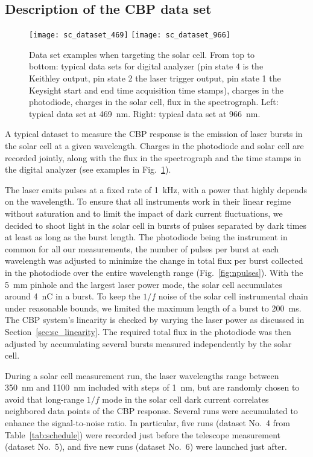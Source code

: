 \subsection{Description of the CBP data set}
\label{sec:cbp_datadesc}

\begin{figure}%
\centering
\texttt{[image: sc\_dataset\_469]}
\texttt{[image: sc\_dataset\_966]}
\caption{Data set examples when targeting the solar cell. From top to bottom: typical data sets for digital analyzer (pin state 4 is the Keithley output, pin state 2 the laser trigger output, pin state 1 the Keysight start and end time acquisition time stamps), charges in the photodiode, charges in the solar cell, flux in the spectrograph. Left: typical data set at \SI{469}{\nm}. Right: typical data set at \SI{966}{\nm}.}\label{fig:sc_dataset_examples}
\end{figure}

A typical dataset to measure the CBP response is the emission of laser bursts in the solar cell at a given wavelength. Charges in the photodiode and solar cell are recorded jointly, along with the flux in the spectrograph and the time stamps in the digital analyzer (see examples in Fig.~\ref{fig:sc_dataset_examples}).

The laser emits pulses at a fixed rate of \SI{1}{\kilo\hertz}, with a power that highly depends on the wavelength. To ensure that all instruments work in their linear regime without saturation and to limit the impact of dark current fluctuations, we decided to shoot light in the solar cell in bursts of pulses separated by dark times at least as long as the burst length. The photodiode being the instrument in common for all our measurements, the number of pulses per burst at each wavelength was adjusted to minimize the change in total flux per burst collected in the photodiode over the entire wavelength range (Fig.~\ref{fig:npulses}). With the \SI{5}{\mm} pinhole and the largest laser power mode, the solar cell accumulates around \SI{4}{\nano\coulomb} in a burst. To keep the $1/f$ noise of the solar cell instrumental chain under reasonable bounds, we limited the maximum length of a burst to \SI{200}{\ms}. The CBP system's linearity is checked by varying the laser power as discussed in Section~\ref{sec:sc_linearity}.  The required total flux in the photodiode was then adjusted by accumulating several bursts measured independently by the solar cell.

During a solar cell measurement run, the laser wavelengths range between \SI{350}{\nano\meter} and \SI{1100}{\nano\meter} included with steps of \SI{1}{\nm}, but are randomly chosen to avoid that long-range $ 1/f$ mode in the solar cell dark current correlates neighbored data points of the CBP response. Several runs were accumulated to enhance the signal-to-noise ratio. In particular, five runs (dataset No.~4 from Table~\ref{tab:schedule}) were recorded just before the \SD telescope measurement (dataset No.~5), and five new runs (dataset No.~6) were launched just after.

